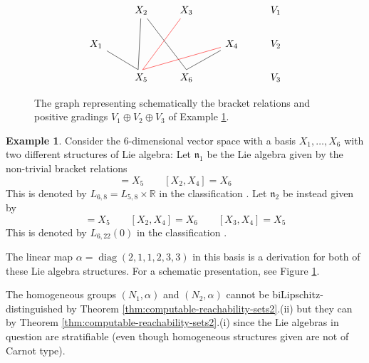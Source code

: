 \documentclass[a4paper,12pt]{amsart}
\DeclareMathOperator{\diag}{diag}
\theoremstyle{plain}
\theoremstyle{definition}
\newtheorem{Esim}[maar]{Example}
\theoremstyle{plain}
\theoremstyle{remark}
\begin{document}
\begin{figure}[h]
	\begin{equation*}
	\begin{tikzcd}
	& X_2 \arrow[dd, dash, end anchor=110] \arrow[ddr, dash, end anchor=90] & X_3 \arrow[ddl, dash, end anchor=80, red]  & & V_1
	\\
	X_1 \arrow[dr, dash, end anchor=110] &   
	& & X_4 \arrow[dl, dash, end anchor=90] \arrow[dll, dash, end anchor=80, red] & V_2
	\\
	& X_5 & X_6 && V_3
	\end{tikzcd}
	\end{equation*}
	\caption{The graph representing schematically the bracket relations and positive gradings \(V_1 \oplus V_2 \oplus V_3\) of Example \ref{esim:6D-heintzes-different-nilrad}.}
	\label{fig:bracket-relations}
\end{figure}



\begin{Esim} \label{esim:6D-heintzes-different-nilrad}
	Consider the 6-dimensional vector space with a basis \( X_1,\ldots,X_6 \) with two different structures of Lie algebra:
	Let \( \mathfrak{n}_1 \) be the Lie algebra  given by the non-trivial bracket relations
	\begin{equation*}
	[X_1,X_2] = X_5 \qquad
	[X_2,X_4] = X_6 \qquad
	\end{equation*}
	This is denoted by \( L_{6,8} = L_{5,8} \times \mathbb{R} \) in the classification \cite{deGraaf-2007-dim_6_nilpotent_lie_algebras}.
	Let \( \mathfrak{n}_2 \) be instead given by
	\begin{equation*}
	[X_1,X_2] = X_5 \qquad
	[X_2,X_4] = X_6 \qquad
	[X_3,X_4] = X_5 
	\end{equation*}
	This is denoted by \( L_{6,22}(0) \) in the classification \cite{deGraaf-2007-dim_6_nilpotent_lie_algebras}. 
	
	The linear map \( \alpha = \diag(2,1,1,2,3,3) \) in this basis is a derivation for both of these Lie algebra structures. For a schematic presentation, see Figure \ref{fig:bracket-relations}.
	
 The homogeneous groups \((N_1,\alpha)\) and \( (N_2,\alpha) \) cannot be biLipschitz-distinguished by Theorem \ref{thm:computable-reachability-sets2}.(ii) but they can by Theorem \ref{thm:computable-reachability-sets2}.(i) since the Lie algebras in question are stratifiable (even though homogeneous structures given are not of Carnot type).
\end{Esim}
\end{document}
